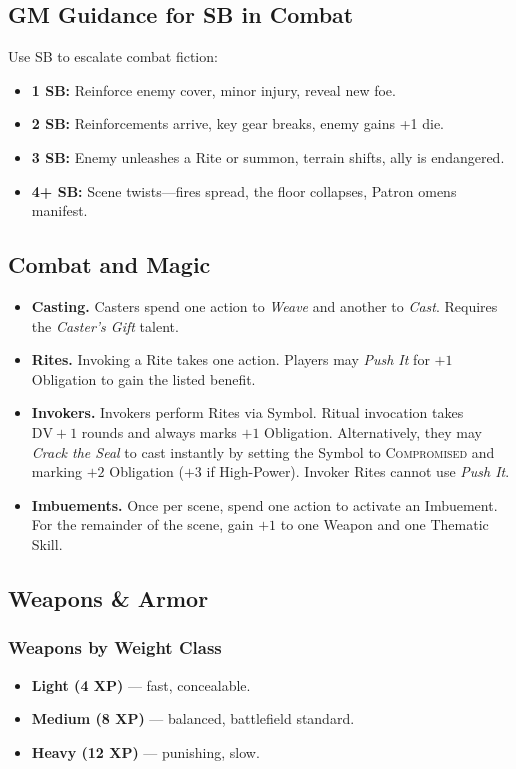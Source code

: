\subsection{GM Guidance for SB in Combat}
Use SB to escalate combat fiction:
\begin{itemize}
  \item \textbf{1 SB:} Reinforce enemy cover, minor injury, reveal new foe.
  \item \textbf{2 SB:} Reinforcements arrive, key gear breaks, enemy gains +1 die.
  \item \textbf{3 SB:} Enemy unleashes a Rite or summon, terrain shifts, ally is endangered.
  \item \textbf{4+ SB:} Scene twists—fires spread, the floor collapses, Patron omens manifest.
\end{itemize}

\subsection{Combat and Magic}
\begin{itemize}
  \item \textbf{Casting.} Casters spend one action to \emph{Weave} and another to \emph{Cast}. Requires the \emph{Caster’s Gift} talent. 
  \item \textbf{Rites.} Invoking a Rite takes one action. Players may \emph{Push It} for $+1$ Obligation to gain the listed benefit. 
  \item \textbf{Invokers.} Invokers perform Rites via Symbol. Ritual invocation takes $\text{DV}+1$ rounds and always marks $+1$ Obligation. Alternatively, they may \emph{Crack the Seal} to cast instantly by setting the Symbol to \textsc{Compromised} and marking $+2$ Obligation ($+3$ if High-Power). Invoker Rites cannot use \emph{Push It}. 
  \item \textbf{Imbuements.} Once per scene, spend one action to activate an Imbuement. For the remainder of the scene, gain $+1$ to one Weapon and one Thematic Skill. 
\end{itemize}

\subsection{Weapons \& Armor}
\label{app:weapons-armor}

\subsubsection{Weapons by Weight Class}
\begin{itemize}
  \item \textbf{Light (4 XP)} — fast, concealable.
  \item \textbf{Medium (8 XP)} — balanced, battlefield standard.
  \item \textbf{Heavy (12 XP)} — punishing, slow.
\end{itemize}

